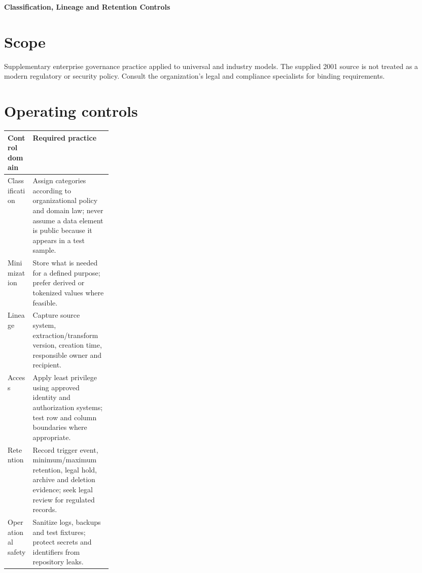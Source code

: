 \documentclass[11pt,letterpaper]{article}
\begin{document}
\begin{center}
{\LARGE\bfseries\color{navy} Classification, Lineage and Retention Controls}\par
\vspace{0.25em}{\large Supplementary governance reference}\par
{}
\end{center}
\vspace{0.8em}
\section{Scope}
Supplementary enterprise governance practice applied to universal and industry models. The supplied 2001 source is not treated as a modern regulatory or security policy. Consult the organization's legal and compliance specialists for binding requirements.


\section{Operating controls}
\begin{tabularx}{\linewidth}{@{}>{\raggedright\arraybackslash}p{0.24\linewidth}>{\raggedright\arraybackslash}X@{}}
\toprule
\textbf{Control domain} & \textbf{Required practice} \\ 
\midrule
Classification & Assign categories according to organizational policy and domain law; never assume a data element is public because it appears in a test sample. \\ 
Minimization & Store what is needed for a defined purpose; prefer derived or tokenized values where feasible. \\ 
Lineage & Capture source system, extraction/transform version, creation time, responsible owner and recipient. \\ 
Access & Apply least privilege using approved identity and authorization systems; test row and column boundaries where appropriate. \\ 
Retention & Record trigger event, minimum/maximum retention, legal hold, archive and deletion evidence; seek legal review for regulated records. \\ 
Operational safety & Sanitize logs, backups and test fixtures; protect secrets and identifiers from repository leaks. \\ 
\bottomrule
\end{tabularx}
\end{document}
